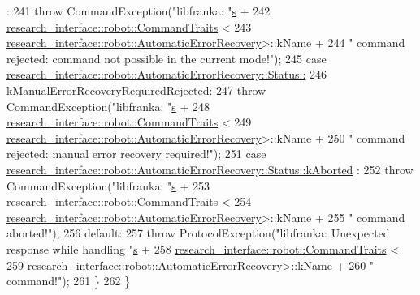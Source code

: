 \begin{DoxyCode}
      :
241       \textcolor{keywordflow}{throw} CommandException(\textcolor{stringliteral}{"libfranka: "}\hyperlink{namespaceservice__node__3_aa976421a49e0b54f23833423400849ae}{s} +
242                              \hyperlink{structresearch__interface_1_1robot_1_1CommandTraits}{research\_interface::robot::CommandTraits}
      <
243                                  
      \hyperlink{structresearch__interface_1_1robot_1_1AutomaticErrorRecovery}{research\_interface::robot::AutomaticErrorRecovery}>::kName 
      +
244                              \textcolor{stringliteral}{" command rejected: command not possible in the current mode!"});
245     \textcolor{keywordflow}{case} \hyperlink{structresearch__interface_1_1robot_1_1AutomaticErrorRecovery_a551f4dbc4e62d57b411344538b806adca3194a60c6aa14bbe09fed9d55c44e3d2}{research\_interface::robot::AutomaticErrorRecovery::Status::}
246 \hyperlink{structresearch__interface_1_1robot_1_1AutomaticErrorRecovery_a551f4dbc4e62d57b411344538b806adca3194a60c6aa14bbe09fed9d55c44e3d2}{        kManualErrorRecoveryRequiredRejected}:
247       \textcolor{keywordflow}{throw} CommandException(\textcolor{stringliteral}{"libfranka: "}\hyperlink{namespaceservice__node__3_aa976421a49e0b54f23833423400849ae}{s} +
248                              \hyperlink{structresearch__interface_1_1robot_1_1CommandTraits}{research\_interface::robot::CommandTraits}
      <
249                                  
      \hyperlink{structresearch__interface_1_1robot_1_1AutomaticErrorRecovery}{research\_interface::robot::AutomaticErrorRecovery}>::kName 
      +
250                              \textcolor{stringliteral}{" command rejected: manual error recovery required!"});
251     \textcolor{keywordflow}{case} \hyperlink{structresearch__interface_1_1robot_1_1AutomaticErrorRecovery_a551f4dbc4e62d57b411344538b806adcac20d0424ae4484fda4424713f021d736}{research\_interface::robot::AutomaticErrorRecovery::Status::kAborted}
      :
252       \textcolor{keywordflow}{throw} CommandException(\textcolor{stringliteral}{"libfranka: "}\hyperlink{namespaceservice__node__3_aa976421a49e0b54f23833423400849ae}{s} +
253                              \hyperlink{structresearch__interface_1_1robot_1_1CommandTraits}{research\_interface::robot::CommandTraits}
      <
254                                  
      \hyperlink{structresearch__interface_1_1robot_1_1AutomaticErrorRecovery}{research\_interface::robot::AutomaticErrorRecovery}>::kName 
      +
255                              \textcolor{stringliteral}{" command aborted!"});
256     \textcolor{keywordflow}{default}:
257       \textcolor{keywordflow}{throw} ProtocolException(\textcolor{stringliteral}{"libfranka: Unexpected response while handling "}\hyperlink{namespaceservice__node__3_aa976421a49e0b54f23833423400849ae}{s} +
258                               \hyperlink{structresearch__interface_1_1robot_1_1CommandTraits}{research\_interface::robot::CommandTraits}
      <
259                                   
      \hyperlink{structresearch__interface_1_1robot_1_1AutomaticErrorRecovery}{research\_interface::robot::AutomaticErrorRecovery}>::kName 
      +
260                               \textcolor{stringliteral}{" command!"});
261   \}
262 \}
\end{DoxyCode}
